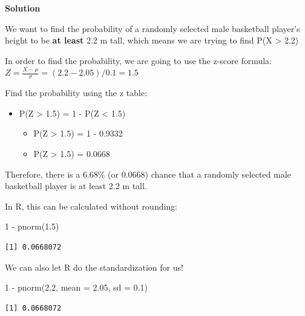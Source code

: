 \documentclass[
  letterpaper,
  DIV=11,
  numbers=noendperiod,
  oneside]{scrreprt}
\newenvironment{Shaded}{\begin{snugshade}}{\end{snugshade}}
\newcommand{\AttributeTok}[1]{\textcolor[rgb]{0.40,0.45,0.13}{#1}}
\newcommand{\DecValTok}[1]{\textcolor[rgb]{0.68,0.00,0.00}{#1}}
\newcommand{\FloatTok}[1]{\textcolor[rgb]{0.68,0.00,0.00}{#1}}
\newcommand{\FunctionTok}[1]{\textcolor[rgb]{0.28,0.35,0.67}{#1}}
\newcommand{\NormalTok}[1]{\textcolor[rgb]{0.00,0.23,0.31}{#1}}
\newcommand{\SpecialCharTok}[1]{\textcolor[rgb]{0.37,0.37,0.37}{#1}}
\providecommand{\tightlist}{%
  \setlength{\itemsep}{0pt}\setlength{\parskip}{0pt}}\usepackage{longtable,booktabs,array}
\begin{document}
\textbf{Solution}

We want to find the probability of a randomly selected male basketball
player's height to be \textbf{at least} 2.2 m tall, which means we are
trying to find P(X \textgreater{} 2.2)

In order to find the probability, we are going to use the z-score
formula: \(Z = \frac{X - \mu}{\sigma} = (2.2 - 2.05) / 0.1 = 1.5\)

Find the probability using the z table:

\begin{itemize}
\tightlist
\item
  P(Z \textgreater{} 1.5) = 1 - P(Z \textless{} 1.5)

  \begin{itemize}
  \tightlist
  \item
    P(Z \textgreater{} 1.5) = 1 - 0.9332
  \item
    P(Z \textgreater{} 1.5) = 0.0668
  \end{itemize}
\end{itemize}

Therefore, there is a 6.68\% (or 0.0668) chance that a randomly selected
male basketball player is at least 2.2 m tall.

In R, this can be calculated without rounding:

\begin{Shaded}
\begin{Highlighting}[]
\DecValTok{1} \SpecialCharTok{{-}} \FunctionTok{pnorm}\NormalTok{(}\FloatTok{1.5}\NormalTok{)}
\end{Highlighting}
\end{Shaded}

\begin{verbatim}
[1] 0.0668072
\end{verbatim}

We can also let R do the standardization for us!

\begin{Shaded}
\begin{Highlighting}[]
\DecValTok{1} \SpecialCharTok{{-}} \FunctionTok{pnorm}\NormalTok{(}\FloatTok{2.2}\NormalTok{, }\AttributeTok{mean =} \FloatTok{2.05}\NormalTok{, }\AttributeTok{sd =} \FloatTok{0.1}\NormalTok{)}
\end{Highlighting}
\end{Shaded}

\begin{verbatim}
[1] 0.0668072
\end{verbatim}
\end{document}
